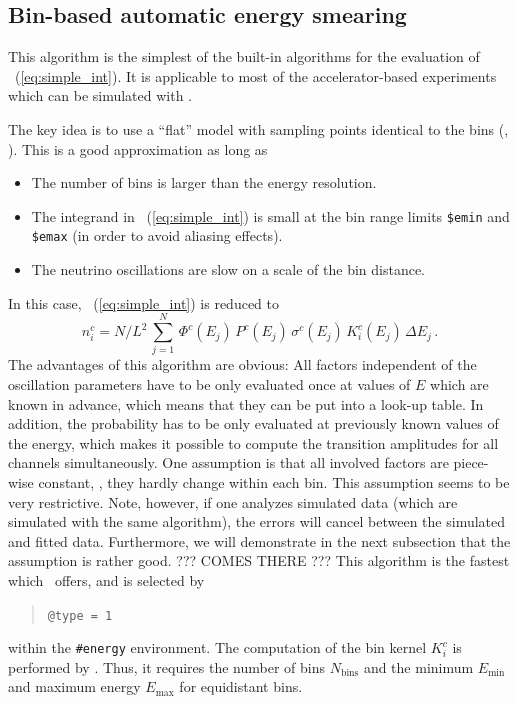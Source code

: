 \subsection{Bin-based automatic energy smearing}

This algorithm is the simplest of the built-in algorithms for the evaluation
of \eq~(\ref{eq:simple_int}). It is applicable to most of the
 accelerator-based experiments which can be simulated with \GLOBES .

The key idea is to use a ``flat'' model with sampling points identical to 
the bins (\cf, ). This is a good approximation as long as
\begin{itemize}
\item
 The number of bins is larger than the energy resolution.
\item
 The integrand in \eq~(\ref{eq:simple_int}) is small at the bin range limits
{\tt \$emin} and {\tt \$emax} (in order to avoid aliasing effects).
\item
 The neutrino oscillations are slow on a scale of the bin distance.
\end{itemize}
In this case, \eq~(\ref{eq:simple_int}) is reduced to
\begin{equation}
\label{eq:algo_one}
n_i^c=N/L^2 \, \sum_{j=1}^N \,  \Phi^c(E_j)\,
P^c(E_j)\,
\sigma^c(E_j)\,
K_i^c(E_j) \, \Delta E_j \,.
\end{equation}
The advantages of this algorithm are obvious: All factors
independent of the oscillation parameters have to be only evaluated once
at values of $E$ which are known in advance, which means that they can be put 
into a look-up table. In addition, the probability
has to be only evaluated at previously known values of the energy, which
makes it possible to compute the transition amplitudes for all channels
simultaneously. One assumption is that all involved factors are piece-wise
constant, \ie, they hardly change within each bin. This 
assumption seems to be very restrictive. Note, however, if one analyzes simulated data (which are simulated with the same algorithm), the errors
will cancel between the simulated and fitted data. 
%
Furthermore, we will demonstrate in the next subsection that the assumption
is rather good. ??? COMES THERE ???
%
This algorithm is the fastest which \GLOBES\ offers, and is selected by
\begin{quote}
{\tt \tb @type = 1}
\end{quote}
within the {\tt \#energy} environment.
The computation of the bin kernel $K_i^c$ is performed
by \GLOBES. Thus, it requires  the number of bins
 $N_\mathrm{bins}$
and the minimum $E_\mathrm{min}$ and maximum energy $E_\mathrm{max}$
for equidistant bins.
 
